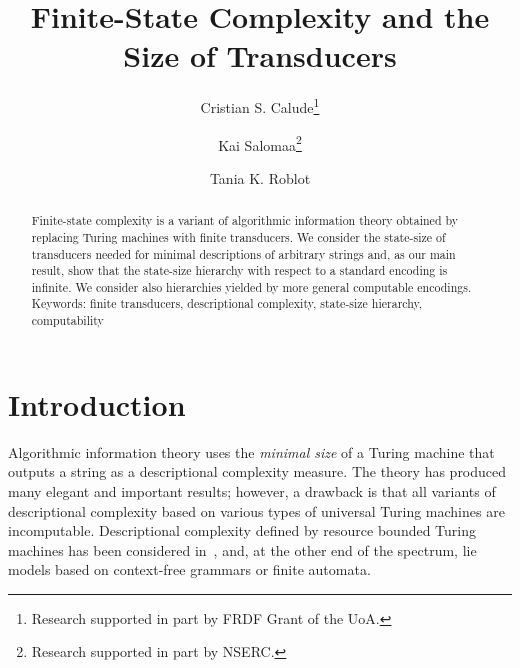 \documentclass[copyright]{eptcs}
\begin{document}
\title{Finite-State Complexity and the Size of Transducers}

\author{Cristian S. Calude\footnote{Research supported in part by FRDF Grant
of the UoA.}\\
\and
Kai Salomaa\footnote{Research supported in part by NSERC.}\\
\and
Tania K. Roblot\\
}

\def\titlerunning{Finite-State Complexity}

\def\authorrunning{C.S.~Calude, K.~Salomaa, T.K.~Roblot}

\maketitle

\begin{abstract}
Finite-state complexity is a variant of algorithmic
information theory obtained by replacing Turing machines
with finite transducers.  We consider the state-size of
transducers needed for minimal descriptions of arbitrary
strings and, as our main result, show that the state-size
hierarchy with respect to a standard encoding is
infinite. We consider also hierarchies yielded by
more general computable encodings.\\
Keywords: finite transducers, descriptional complexity,
state-size hierarchy, computability 
\end{abstract}

\section{Introduction}
\label{intro}

Algorithmic information theory  \cite{Greg,cris}
uses the {\em minimal size\/}  of a Turing machine
that outputs a string  as a descriptional complexity
measure. The theory has produced many elegant and important
results;  however, a drawback is that all  variants
of descriptional complexity 
based on various types of universal Turing
machines are incomputable. 
Descriptional complexity defined by resource
bounded Turing machines has been considered in~\cite{BF},
and, at the other end of the spectrum, lie models
based on context-free grammars or finite automata.
\end{document}
